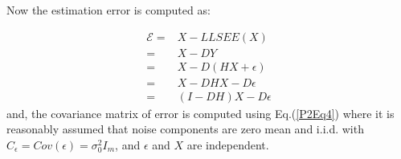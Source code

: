 Now the estimation error is computed as:

\begin{equation}\label{P2Eq3}
\begin{aligned}
\mathcal{E} = & X-LLSEE(X) \\
            = & X-DY \\
            = & X-D(HX+\epsilon)\\
            = & X-DHX-D\epsilon \\
            = &(I-DH)X-D\epsilon
\end{aligned}
\end{equation}
and, the covariance matrix of error is computed using Eq.(\ref{P2Eq4}) where it is reasonably assumed that noise components are zero mean and i.i.d. with $C_{\epsilon}=Cov(\epsilon)=\sigma^{2}_{0} I_{m}$, and $\epsilon$ and $X$ are independent. 

